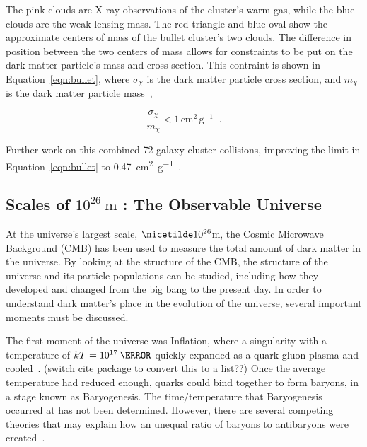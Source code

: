 The pink clouds are X-ray observations of the cluster's warm gas, while the blue clouds are the weak lensing mass.
The red triangle and blue oval show the approximate centers of mass of the bullet cluster's two clouds.
The difference in position between the two centers of mass allows for constraints to be put on the dark matter particle's mass and cross section.
This contraint is shown in Equation~\ref{eqn:bullet}, where $\sigma_{\chi}$ is the dark matter particle cross section, and $m_{\chi}$ is the dark matter particle mass~\cite{bullet_cluster,bullet_cluster2},

\begin{equation}\label{eqn:bullet}
  \frac{\sigma_{\chi}}{m_{\chi}} < 1 \, \textrm{cm}^2 \, \textrm{g}^{-1} \;\; .
\end{equation}

Further work on this combined 72 galaxy cluster collisions, improving the limit in Equation~\ref{eqn:bullet} to \SI{0.47}{cm^2 g^{-1}}~\cite{cluster_72}.


\subsection{Scales of $10^{26}\:\text{m}$ : The Observable Universe}\label{dm_universe}
At the universe's largest scale, $\nicetilde 10^{26}$m, the Cosmic Microwave Background (CMB) has been used to measure the total amount of dark matter in the universe.
By looking at the structure of the CMB, the structure of the universe and its particle populations can be studied, including how they developed and changed from the big bang to the present day.
In order to understand dark matter's place in the evolution of the universe, several important moments must be discussed.

The first moment of the universe was Inflation, where a singularity with a temperature of $kT=10^{17}\:\textrm{\GeV{}}$ quickly expanded as a quark-gluon plasma and cooled~\cite{inflation0,inflation1,inflation2,inflation3}.
{\color{red}(switch cite package to convert this to a list??)}
Once the average temperature had reduced enough, quarks could bind together to form baryons, in a stage known as Baryogenesis.
The time/temperature that Baryogenesis occurred at has not been determined.
However, there are several competing theories that may explain how an unequal ratio of baryons to antibaryons were created~\cite{baryogenesis1,baryogenesis2}.

